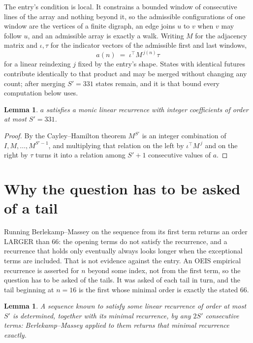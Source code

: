 \documentclass[11pt,a4paper]{article}
\theoremstyle{plain}
\newtheorem{lemma}[theorem]{Lemma}
\theoremstyle{definition}
\begin{document}
The entry's condition is local. It constrains a bounded window of consecutive lines of the
array and nothing beyond it, so the admissible configurations of one window are the vertices of
a finite digraph, an edge joins $u$ to $v$ when $v$ may follow $u$, and an admissible array is
exactly a walk. Writing $M$ for the adjacency matrix and $\iota,\tau$ for the indicator vectors
of the admissible first and last windows,
\[
a(n)\;=\;\iota^{\!\top}M^{\,j(n)}\tau
\]
for a linear reindexing $j$ fixed by the entry's shape. States with identical futures
contribute identically to that product and may be merged without changing any count; after
merging $S'=331$ states remain, and it is that bound every computation below uses.

\begin{lemma}\label{lem:cf}
$a$ satisfies a monic linear recurrence with integer coefficients of order at most $S'=331$.
\end{lemma}

\begin{proof}
By the Cayley--Hamilton theorem $M^{S'}$ is an integer combination of $I,M,\dots,M^{S'-1}$,
and multiplying that relation on the left by $\iota^{\!\top}M^{\,j}$ and on the right by
$\tau$ turns it into a relation among $S'+1$ consecutive values of $a$.
\end{proof}

\section{Why the question has to be asked of a tail}

Running Berlekamp--Massey on the sequence from its first term returns an order LARGER than $66$: the opening terms do not satisfy the recurrence, and a recurrence that holds only eventually always looks longer when the exceptional terms are included. That is not evidence against the entry. An OEIS empirical recurrence is asserted for $n$ beyond some index, not from the first term, so the question has to be asked of the tails. It was asked of each tail in turn, and the tail beginning at $n=16$ is the first whose minimal order is exactly the stated $66$.

\begin{lemma}\label{lem:bm}
A sequence known to satisfy some linear recurrence of order at most $S'$ is determined,
together with its minimal recurrence, by any $2S'$ consecutive terms: Berlekamp--Massey applied
to them returns that minimal recurrence exactly.
\end{lemma}
\end{document}
